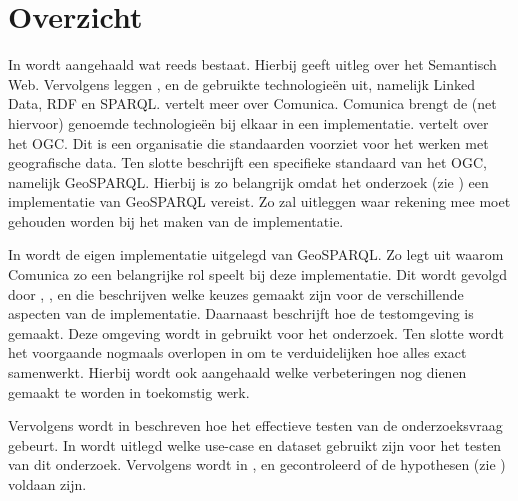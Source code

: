 \section{Overzicht}

In  wordt aangehaald wat reeds bestaat. Hierbij geeft  uitleg over het Semantisch Web. Vervolgens leggen ,  en  de gebruikte technologieën uit, namelijk Linked Data, RDF en SPARQL.  vertelt meer over Comunica. Comunica brengt de (net hiervoor) genoemde technologieën bij elkaar in een implementatie.  vertelt over het OGC. Dit is een organisatie die standaarden voorziet voor het werken met geografische data. Ten slotte beschrijft  een specifieke standaard van het OGC, namelijk GeoSPARQL. Hierbij is  zo belangrijk omdat het onderzoek (zie ) een implementatie van GeoSPARQL vereist. Zo zal  uitleggen waar rekening mee moet gehouden worden bij het maken van de implementatie.

In  wordt de eigen implementatie uitgelegd van GeoSPARQL. Zo legt  uit waarom Comunica zo een belangrijke rol speelt bij deze implementatie. Dit wordt gevolgd door , ,  en  die beschrijven welke keuzes gemaakt zijn voor de verschillende aspecten van de implementatie. Daarnaast beschrijft  hoe de testomgeving is gemaakt. Deze omgeving wordt in  gebruikt voor het onderzoek. Ten slotte wordt het voorgaande nogmaals overlopen in  om te verduidelijken hoe alles exact samenwerkt. Hierbij wordt ook aangehaald welke verbeteringen nog dienen gemaakt te worden in toekomstig werk.

Vervolgens wordt in  beschreven hoe het effectieve testen van de onderzoeksvraag gebeurt. In  wordt uitlegd welke use-case en dataset gebruikt zijn voor het testen van dit onderzoek. Vervolgens wordt in ,  en  gecontroleerd of de hypothesen (zie ) voldaan zijn.

